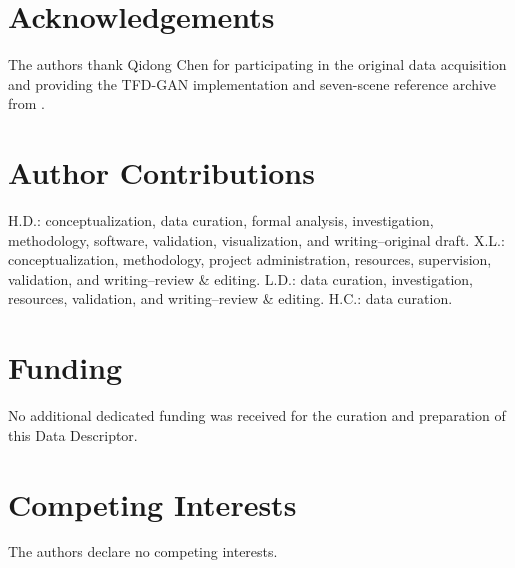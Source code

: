 \documentclass[a4paper,10pt]{article}
\begin{document}
\section*{Acknowledgements}
The authors thank Qidong Chen for participating in the original data acquisition and providing the TFD-GAN implementation and seven-scene reference archive from \cite{chen2026thesis}.

\section*{Author Contributions}
H.D.: conceptualization, data curation, formal analysis, investigation, methodology, software, validation, visualization, and writing--original draft. X.L.: conceptualization, methodology, project administration, resources, supervision, validation, and writing--review \& editing. L.D.: data curation, investigation, resources, validation, and writing--review \& editing. H.C.: data curation.

\section*{Funding}
No additional dedicated funding was received for the curation and preparation of this Data Descriptor.

\section*{Competing Interests}
The authors declare no competing interests.

\renewcommand{\bibfont}{\small}
\setlength{\bibsep}{2pt}


\end{document}
